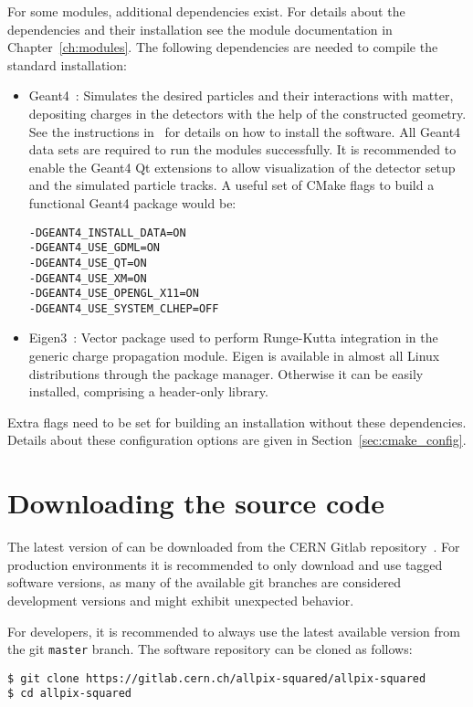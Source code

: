 For some modules, additional dependencies exist.
For details about the dependencies and their installation see the module documentation in Chapter~\ref{ch:modules}.
The following dependencies are needed to compile the standard installation:
\begin{itemize}
\item Geant4~\cite{geant4}: Simulates the desired particles and their interactions with matter, depositing charges in the detectors with the help of the constructed geometry.
See the instructions in~\cite{geant4installation} for details on how to install the software.
All Geant4 data sets are required to run the modules successfully.
It is recommended to enable the Geant4 Qt extensions to allow visualization of the detector setup and the simulated particle tracks.
A useful set of CMake flags to build a functional Geant4 package would be:
\begin{verbatim}
-DGEANT4_INSTALL_DATA=ON
-DGEANT4_USE_GDML=ON
-DGEANT4_USE_QT=ON
-DGEANT4_USE_XM=ON
-DGEANT4_USE_OPENGL_X11=ON
-DGEANT4_USE_SYSTEM_CLHEP=OFF
\end{verbatim}
\item Eigen3~\cite{eigen3}: Vector package used to perform Runge-Kutta integration in the generic charge propagation module.
Eigen is available in almost all Linux distributions through the package manager.
Otherwise it can be easily installed, comprising a header-only library.
\end{itemize}
Extra flags need to be set for building an \apsq installation without these dependencies.
Details about these configuration options are given in Section~\ref{sec:cmake_config}.

\section{Downloading the source code}
The latest version of \apsq can be downloaded from the CERN Gitlab repository~\cite{ap2-repo}.
For production environments it is recommended to only download and use tagged software versions, as many of the available git branches are considered development versions and might exhibit unexpected behavior.

For developers, it is recommended to always use the latest available version from the git \texttt{master} branch.
The software repository can be cloned as follows:

\begin{verbatim}
$ git clone https://gitlab.cern.ch/allpix-squared/allpix-squared
$ cd allpix-squared
\end{verbatim}

